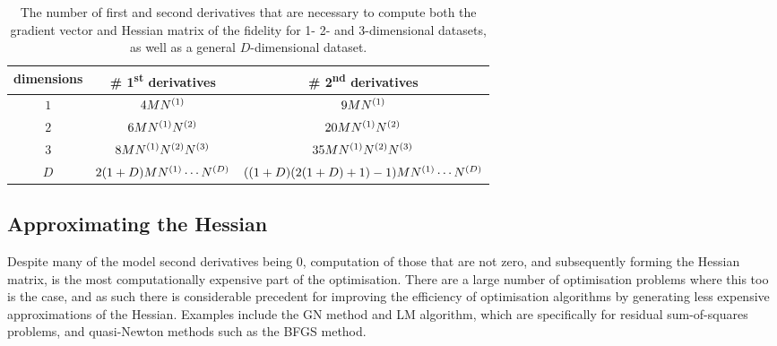 \begin{table}
    \begin{center}
        \begin{tabular}{ c c c }
            \toprule
            dimensions &
                \# 1\textsuperscript{st} derivatives &
                \# 2\textsuperscript{nd} derivatives\\
            \midrule
            $1$ & $4MN^{(1)}$ & $9MN^{(1)}$\\
            $2$ & $6MN^{(1)}N^{(2)}$ & $20MN^{(1)}N^{(2)}$\\
            $3$ & $8MN^{(1)}N^{(2)}N^{(3)}$ & $35MN^{(1)}N^{(2)}N^{(3)}$\\
            $D$ &  $2(1 + D)M N^{(1)} \cdots N^{(D)}$ &  $((1 + D)(2(1 + D) + 1) - 1)M N^{(1)}\cdots N^{(D)}$\\
            \bottomrule
        \end{tabular}
    \end{center}
    \caption{
        The number of first and second derivatives that are necessary to
        compute both the gradient vector and Hessian matrix of the fidelity for
        1- 2- and 3-dimensional datasets, as well as a general $D$-dimensional
        dataset.
    }
    \label{tab:number-of-derivatives}
\end{table}

\subsection{Approximating the Hessian}
Despite many of the model second derivatives being $0$, computation of those
that are not zero, and subsequently forming the Hessian matrix, is the
most computationally expensive part of the optimisation. There are a large
number of optimisation problems where this too is the case, and as such there
is considerable precedent for improving the efficiency of optimisation
algorithms by generating less expensive approximations of the Hessian.
Examples include the \ac{GN} method and \ac{LM} algorithm,
which are specifically for residual sum-of-squares problems\cite[Chapter
10]{Nocedal2006}, and quasi-Newton methods such as the BFGS method\cite[Chapter
6]{Nocedal2006}.

